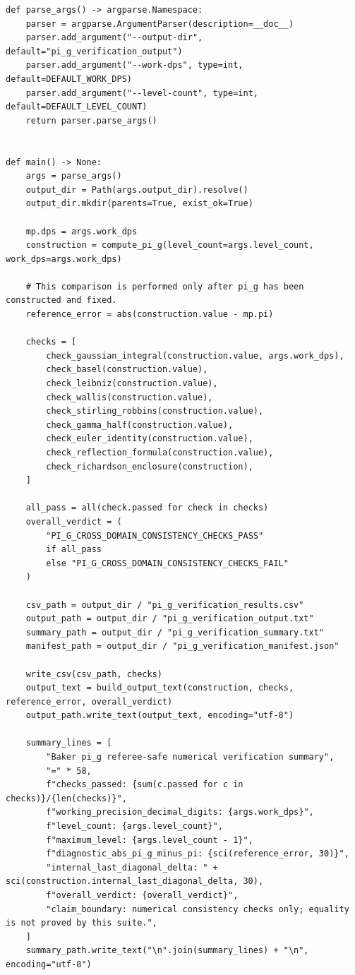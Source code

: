 \documentclass[11pt]{article}
\begin{document}
\begin{lstlisting}[style=pythonstyle,caption={\texttt{verify\_pi\_g\_identities.py}}]
def parse_args() -> argparse.Namespace:
    parser = argparse.ArgumentParser(description=__doc__)
    parser.add_argument("--output-dir", default="pi_g_verification_output")
    parser.add_argument("--work-dps", type=int, default=DEFAULT_WORK_DPS)
    parser.add_argument("--level-count", type=int, default=DEFAULT_LEVEL_COUNT)
    return parser.parse_args()


def main() -> None:
    args = parse_args()
    output_dir = Path(args.output_dir).resolve()
    output_dir.mkdir(parents=True, exist_ok=True)

    mp.dps = args.work_dps
    construction = compute_pi_g(level_count=args.level_count, work_dps=args.work_dps)

    # This comparison is performed only after pi_g has been constructed and fixed.
    reference_error = abs(construction.value - mp.pi)

    checks = [
        check_gaussian_integral(construction.value, args.work_dps),
        check_basel(construction.value),
        check_leibniz(construction.value),
        check_wallis(construction.value),
        check_stirling_robbins(construction.value),
        check_gamma_half(construction.value),
        check_euler_identity(construction.value),
        check_reflection_formula(construction.value),
        check_richardson_enclosure(construction),
    ]

    all_pass = all(check.passed for check in checks)
    overall_verdict = (
        "PI_G_CROSS_DOMAIN_CONSISTENCY_CHECKS_PASS"
        if all_pass
        else "PI_G_CROSS_DOMAIN_CONSISTENCY_CHECKS_FAIL"
    )

    csv_path = output_dir / "pi_g_verification_results.csv"
    output_path = output_dir / "pi_g_verification_output.txt"
    summary_path = output_dir / "pi_g_verification_summary.txt"
    manifest_path = output_dir / "pi_g_verification_manifest.json"

    write_csv(csv_path, checks)
    output_text = build_output_text(construction, checks, reference_error, overall_verdict)
    output_path.write_text(output_text, encoding="utf-8")

    summary_lines = [
        "Baker pi_g referee-safe numerical verification summary",
        "=" * 58,
        f"checks_passed: {sum(c.passed for c in checks)}/{len(checks)}",
        f"working_precision_decimal_digits: {args.work_dps}",
        f"level_count: {args.level_count}",
        f"maximum_level: {args.level_count - 1}",
        f"diagnostic_abs_pi_g_minus_pi: {sci(reference_error, 30)}",
        "internal_last_diagonal_delta: " + sci(construction.internal_last_diagonal_delta, 30),
        f"overall_verdict: {overall_verdict}",
        "claim_boundary: numerical consistency checks only; equality is not proved by this suite.",
    ]
    summary_path.write_text("\n".join(summary_lines) + "\n", encoding="utf-8")


\end{lstlisting}
\end{document}
